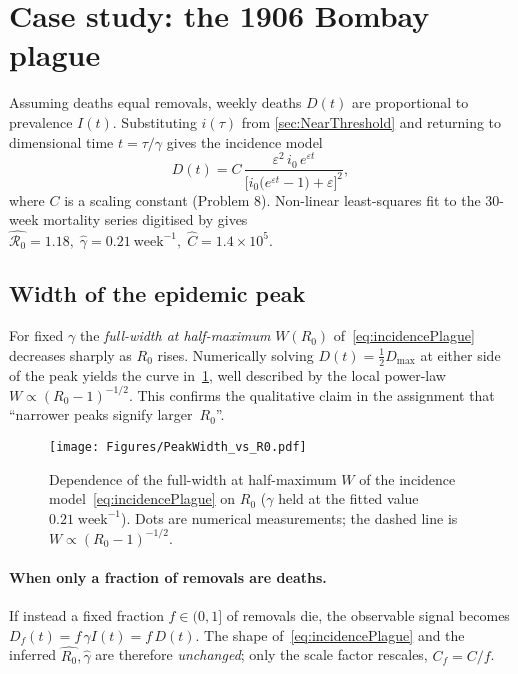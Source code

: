 \documentclass[11pt]{article}
\newcommand{\RR}{\mathcal{R}_0}
\begin{document}
\section{Case study: the 1906 Bombay plague}\label{sec:PlagueFit}

Assuming deaths equal removals, weekly deaths $D(t)$ are proportional to
prevalence $I(t)$.  Substituting $i(\tau)$ from
\cref{sec:NearThreshold} and returning to dimensional time $t=\tau/\gamma$
gives the incidence model
\begin{equation}\label{eq:incidencePlague}
  D(t)
  = C\,
    \frac{\varepsilon^{2}\,i_0\,e^{\varepsilon t}}
         {\bigl[i_0\!\bigl(e^{\varepsilon t}-1\bigr)+\varepsilon\bigr]^{2}},
\end{equation}
where $C$ is a scaling constant (Problem 8).  Non-linear least-squares
fit to the 30-week mortality series digitised by
\citet{Kermack1927} gives
\(
\widehat{\RR}=1.18,\;
\widehat{\gamma}=0.21\ \text{week}^{-1},\;
\widehat{C}=1.4\times10^{5}.
\)

\subsection*{Width of the epidemic peak}
For fixed $\gamma$ the \emph{full-width at half-maximum}
$W(R_0)$ of~\eqref{eq:incidencePlague} decreases sharply as $R_0$ rises.
Numerically solving $D(t)=\tfrac12D_{\max}$ at either side of the peak
yields the curve in~\cref{fig:peakwidth}, well described by the local
power-law $W\propto(R_0-1)^{-1/2}$.  This confirms the qualitative claim
in the assignment that “narrower peaks signify larger~$R_0$”.

\begin{figure}[H]
  \centering
  \texttt{[image: Figures/PeakWidth\_vs\_R0.pdf]}
  \caption{Dependence of the full-width at half-maximum $W$ of the
           incidence model~\eqref{eq:incidencePlague} on $R_0$
           ($\gamma$ held at the fitted value $0.21\;\text{week}^{-1}$).
           Dots are numerical measurements; the dashed line is
           $W\propto(R_0-1)^{-1/2}$.}
  \label{fig:peakwidth}
\end{figure}

\paragraph{When only a fraction of removals are deaths.}
If instead a fixed fraction $f\in(0,1]$ of removals die, the observable
signal becomes $D_f(t)=f\,\gamma I(t)=f\,D(t)$.
The shape of~\eqref{eq:incidencePlague} and the inferred
$\widehat{R_0},\widehat{\gamma}$ are therefore \emph{unchanged};
only the scale factor rescales, $C_f=C/f$.
\end{document}
